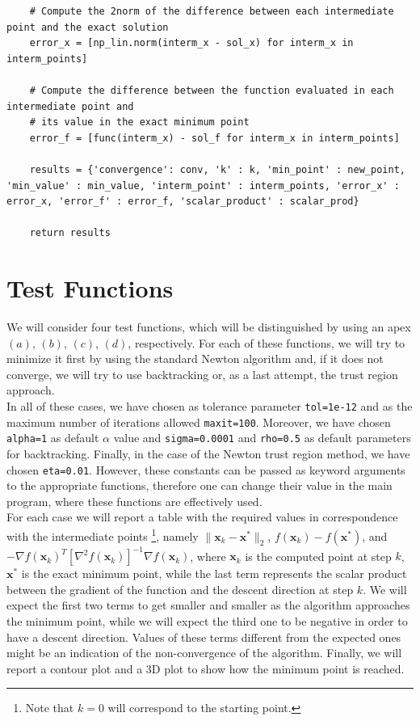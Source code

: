 \documentclass[a4paper,11pt]{article}
\begin{document}
\begin{verbatim}
    # Compute the 2norm of the difference between each intermediate point and the exact solution
    error_x = [np_lin.norm(interm_x - sol_x) for interm_x in interm_points]

    # Compute the difference between the function evaluated in each intermediate point and 
    # its value in the exact minimum point
    error_f = [func(interm_x) - sol_f for interm_x in interm_points]

    results = {'convergence': conv, 'k' : k, 'min_point' : new_point, 'min_value' : min_value, 'interm_point' : interm_points, 'error_x' : error_x, 'error_f' : error_f, 'scalar_product' : scalar_prod}

    return results
\end{verbatim}


	\section{Test Functions}
	We will consider four test functions, which will be distinguished by using an apex $(a)$, $(b)$, $(c)$, $(d)$, respectively. For each of these functions, we will try to minimize it first by using the standard Newton algorithm and, if it does not converge, we will try to use backtracking or, as a last attempt, the trust region approach.\\
	
	\noindent In all of these cases, we have chosen as tolerance parameter  \texttt{tol=1e-12} and as the maximum number of iterations allowed \texttt{maxit=100}. Moreover, we have chosen \texttt{alpha=1} as default $\alpha$ value and \texttt{sigma=0.0001} and \texttt{rho=0.5} as default parameters for backtracking. Finally, in the case of the Newton trust region method, we have chosen \texttt{eta=0.01}. However, these constants can be passed as keyword arguments to the appropriate functions, therefore one can change their value in the main program, where these functions are effectively used.\\
	
	\noindent For each case we will report a table with the required values in correspondence with the intermediate points \footnote{Note that $k=0$ will correspond to the starting point.}, namely $\| \textbf{x}_{k} - \textbf{x}^*\|_{2} $, $f(\textbf{x}_{k}) - f(\textbf{x}^{*}) $, and $-\nabla f(\textbf{x}_{k})^{T} [\nabla^{2}f(\textbf{x}_{k})]^{-1} \nabla f(\textbf{x}_{k})$, where $\textbf{x}_{k}$ is the computed point at step $k$, $\textbf{x}^*$ is the exact minimum point, while the last term represents the scalar product between the gradient of the function and the descent direction at step $k$. We will expect the first two terms to get smaller and smaller as the algorithm approaches the minimum point, while we will expect the third one to be negative in order to have a descent direction. Values of these terms different from the expected ones might be an indication of the non-convergence of the algorithm. Finally, we will report a contour plot and a 3D plot to show how the minimum point is reached.
	
\end{document}
